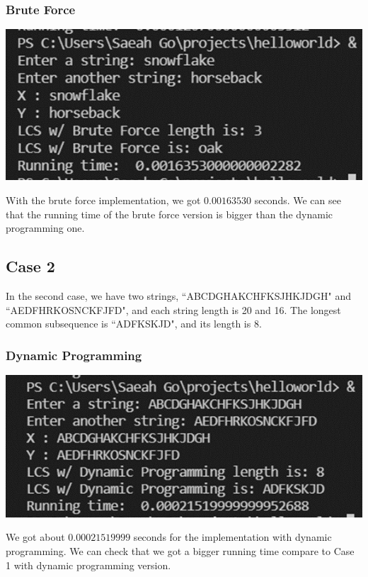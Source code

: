 \documentclass{article}
\begin{document}
\subsubsection{Brute Force}
\begin{center}
\includegraphics[scale = 0.7]{case1 BF.png} \\
\end{center}
With the brute force implementation, we got $0.00163530$ seconds. We can see that the running time of the brute force version is bigger than the dynamic programming one.

\subsection{\textbf{Case 2}} 
In the second case, we have two strings, ``ABCDGHAKCHFKSJHKJDGH" and ``AEDFHRKOSNCKFJFD", and each string length is 20 and 16. The longest common subsequence is ``ADFKSKJD", and its length is 8.
\subsubsection{Dynamic Programming}
\begin{center}
\includegraphics[scale = 0.7]{case2 DP.png} \\
\end{center}
We got about $0.00021519999$ seconds for the implementation with dynamic programming. We can check that we got a bigger running time compare to Case 1 with dynamic programming version.
\end{document}
